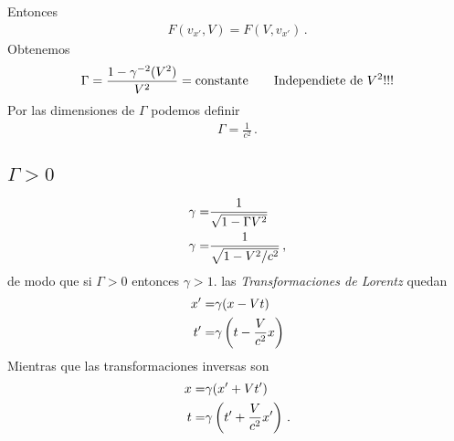 \begin{frame}
Entonces
\begin{align*}
  F(v_{x'},V)=F(V,v_{x'})\,.
\end{align*}
Obtenemos %
\begin{align*}
  \Gamma=\frac{1-\gamma^{-2}(V^2)}{V^2}=\text{constante} \text{\qquad Independiete de $V^2$}!!!
\end{align*}
Por las dimensiones de $\Gamma$ podemos definir
\begin{align*}
  \Gamma=\frac{1}{c^2}\,.
\end{align*}

\subsection{$\Gamma >0$}
\begin{align*}
  \gamma=&\frac{1}{\sqrt{1-\Gamma V^2}}\nonumber\\
  \gamma=&\frac{1}{\sqrt{1-V^2/c^2}}\,,
\end{align*}
de modo que si $\Gamma>0$ entonces $\gamma>1$. las \emph{Transformaciones de Lorentz} quedan
\begin{align}
  \label{eq:lorentz}
  x'=&\gamma(x-V t)\nonumber\\
  t'=&\gamma\left(t-\frac{V}{c^2}x\right)
\end{align}
Mientras que las transformaciones inversas son
\begin{align}
  \label{eq:lorentzinv}
  x=&\gamma(x'+V t')\nonumber\\
  t=&\gamma\left(t'+\frac{V}{c^2}x'\right)\,.
\end{align}



\end{frame}

